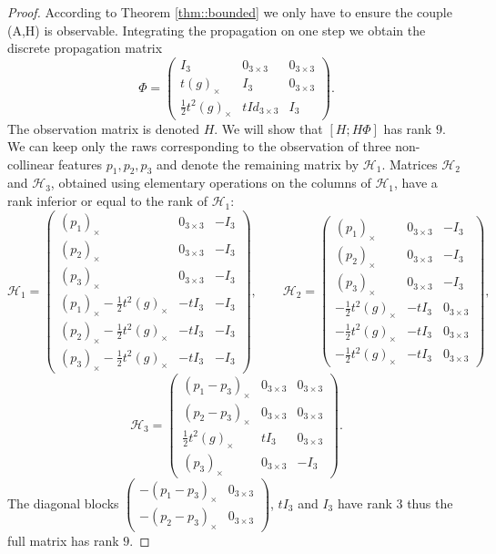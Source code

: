 \documentclass[a4paper,12pt,onecolumn]{article}
\begin{document}
\begin{proof}
According to Theorem \ref{thm::bounded} we only have to ensure the couple (A,H) is observable. Integrating the propagation on one step we obtain the discrete propagation matrix $$ \Phi=\begin{pmatrix} I_3 & 0_{3 \times 3} & 0_{3 \times 3} \\ t(g)_{\times} & I_3 & 0_{3 \times 3} \\ \frac{1}{2} t^2 (g)_\times  & t Id_{3 \times 3} & I_3 \end{pmatrix}. $$ The observation matrix is denoted $H$. We will show that $[H ; H \Phi]$ has rank $9$. We can keep only the raws corresponding to the observation of three non-collinear features $p_1,p_2,p_3$ and denote the remaining matrix by $\mathcal{H}_1$. Matrices $\mathcal{H}_2$ and $\mathcal{H}_3$, obtained using elementary operations on the columns of $\mathcal{H}_1$, have a rank inferior or equal to the rank of $\mathcal{H}_1$:
\[
\mathcal{H}_1=\begin{pmatrix}
(p_1)_\times & 0_{3 \times 3} & -I_3  \\
(p_2)_\times & 0_{3 \times 3} & -I_3  \\
(p_3)_\times & 0_{3 \times 3} & -I_3  \\
(p_1)_\times - \frac{1}{2}t^2 (g)_\times & -t I_3 & -I_3 \\
(p_2)_\times - \frac{1}{2}t^2 (g)_\times & -t I_3 & -I_3 \\
(p_3)_\times - \frac{1}{2}t^2 (g)_\times & -t I_3 & -I_3
 \end{pmatrix},
\qquad
\mathcal{H}_2=\begin{pmatrix}
(p_1)_\times & 0_{3 \times 3} & -I_3  \\
(p_2)_\times & 0_{3 \times 3} & -I_3  \\
(p_3)_\times & 0_{3 \times 3} & -I_3  \\
-\frac{1}{2}t^2 (g)_\times & -t I_3 & 0_{3 \times 3} \\
-\frac{1}{2}t^2 (g)_\times & -t I_3 & 0_{3 \times 3} \\
-\frac{1}{2}t^2 (g)_\times & -t I_3 & 0_{3 \times 3}
 \end{pmatrix},
 \]
 \[
\mathcal{H}_3=\begin{pmatrix}
(p_1-p_3)_\times & 0_{3 \times 3} & 0_{3 \times 3}  \\
(p_2-p_3)_\times & 0_{3 \times 3} & 0_{3 \times 3}  \\
\frac{1}{2}t^2 (g)_\times & t I_3 & 0_{3 \times 3} \\
(p_3)_\times & 0_{3 \times 3} & -I_3 
 \end{pmatrix}.
\]
The diagonal blocks $\begin{pmatrix}
-(p_1-p_3)_\times & 0_{3 \times 3}  \\
-(p_2-p_3)_\times & 0_{3 \times 3} 
 \end{pmatrix}$, $t I_3$ and $I_3$ have rank $3$ thus the full matrix has rank $9$.
\end{proof}
\end{document}
